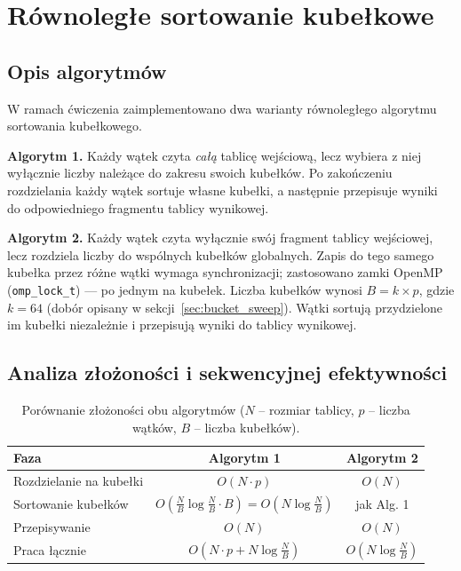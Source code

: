 \documentclass[12pt, a4paper]{article}
\begin{document}
\section{Równoległe sortowanie kubełkowe}

\subsection{Opis algorytmów}

W ramach ćwiczenia zaimplementowano dwa warianty równoległego algorytmu
sortowania kubełkowego.

\textbf{Algorytm 1.}
Każdy wątek czyta \emph{całą} tablicę wejściową, lecz wybiera z niej wyłącznie
liczby należące do zakresu swoich kubełków.
Po zakończeniu rozdzielania każdy wątek sortuje własne kubełki, a następnie
przepisuje wyniki do odpowiedniego fragmentu tablicy wynikowej.

\textbf{Algorytm 2.}
Każdy wątek czyta wyłącznie swój fragment tablicy wejściowej,
lecz rozdziela liczby do wspólnych kubełków globalnych.
Zapis do tego samego kubełka przez różne wątki wymaga synchronizacji;
zastosowano zamki OpenMP (\texttt{omp\_lock\_t}) — po jednym na kubełek.
Liczba kubełków wynosi $B = k \times p$, gdzie $k = 64$ (dobór opisany
w sekcji~\ref{sec:bucket_sweep}).
Wątki sortują przydzielone im kubełki niezależnie i przepisują wyniki do
tablicy wynikowej.

\subsection{Analiza złożoności i sekwencyjnej efektywności}

\begin{table}[H]
  \centering
  \caption{Porównanie złożoności obu algorytmów ($N$ – rozmiar tablicy, $p$ – liczba wątków, $B$ – liczba kubełków).}
  \label{tab:zlozonosc}
  \begin{tabular}{lcc}
    \toprule
    \textbf{Faza} & \textbf{Algorytm 1} & \textbf{Algorytm 2} \\
    \midrule
    Rozdzielanie na kubełki & $O(N \cdot p)$ & $O(N)$ \\
    Sortowanie kubełków  & $O\!\left(\frac{N}{B}\log\frac{N}{B}\cdot B\right) = O(N\log\frac{N}{B})$ & jak Alg. 1 \\
    Przepisywanie        & $O(N)$ & $O(N)$ \\
    \midrule
    Praca łącznie        & $O(N\cdot p + N\log\frac{N}{B})$ & $O(N\log\frac{N}{B})$ \\
    \bottomrule
  \end{tabular}
\end{table}
\end{document}
